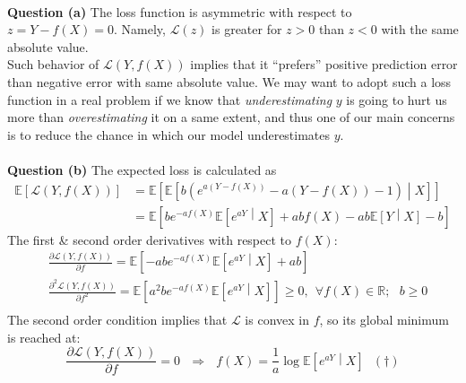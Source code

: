 \documentclass[11pt]{article}
\theoremstyle{definition}
\theoremstyle{hSol}
\begin{document}
    \begin{center}
    \end{center}
    { \hspace*{\fill} \\}
\textbf{Question (a)} The loss function is asymmetric with respect to $z=Y-f(X)=0$. Namely, $\mathcal{L}(z)$ is greater for $z>0$ than $z<0$ with the same absolute value. \\
Such behavior of $\mathcal{L}(Y,f(X))$ implies that it ``prefers'' positive prediction error than negative error with same absolute value. We may want to adopt such a loss function in a real problem if we know that \textit{underestimating} $y$ is going to hurt us more than \textit{overestimating} it on a same extent, and thus one of our main concerns is to reduce the chance in which our model underestimates $y$.\\
~\\
\textbf{Question (b)} The expected loss is calculated as
\begin{equation}
    \begin{split}
        \mathbb{E}\left[\mathcal{L}(Y, f(X))\right] &= \mathbb{E}\left[ \mathbb{E}\left[b\left(e^{a(Y-f(X))}-a(Y-f(X))-1\right)\middle|X\right] \right] \\
        &= \mathbb{E}\left[be^{-af(X)} \mathbb{E}\left[e^{aY}\middle|X\right] + abf(X) - ab \mathbb{E}\left[Y\middle|X\right] -b\right]
    \end{split}
 \end{equation}
 The first \& second order derivatives with respect to $f(X)$:
 \begin{equation}
    \begin{split}
        &\frac{\partial \mathcal{L}(Y,f(X))}{\partial f} = \mathbb{E}\left[-ab e^{-af(X)} \mathbb{E}\left[e^{aY}\middle|X\right] + ab\right] \\
        &\frac{\partial^2 \mathcal{L}(Y,f(X))}{\partial f^2} = \mathbb{E}\left[a^2b e^{-af(X)} \mathbb{E}\left[e^{aY}\middle|X\right]\right] \geq 0, ~~\forall f(X)\in \mathbb{R};~~~b\geq 0 \\
    \end{split}
 \end{equation}
 The second order condition implies that $\mathcal{L}$ is convex in $f$, so its global minimum is reached at:
 \begin{equation}
    \frac{\partial \mathcal{L}(Y,f(X))}{\partial f} = 0~~~\Rightarrow~~~f(X) = \frac{1}{a}\log \mathbb{E}\left[e^{aY}\middle|X\right]~~~(\dag)
 \end{equation}
\end{document}
